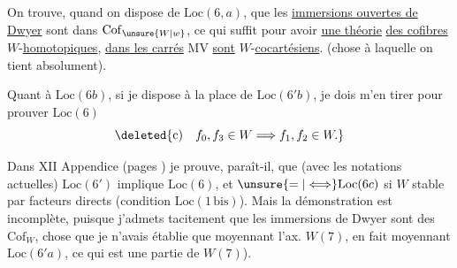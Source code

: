 
On trouve, quand on dispose de $\mathrm{Loc}(6,a)$, que les \uline{immersions ouvertes de Dwyer} sont dans $\mathrm{Cof}_{\unsure{W|w}}$,  ce qui suffit pour avoir \uline{une  théorie} \uline{des cofibres} $W$-\uline{homotopiques}, \uline{dans  les carrés} $\mathrm{MV}$ \uline{sont} $W$-\uline{cocartésiens}. (chose à laquelle on tient absolument).

Quant à $\mathrm{Loc}(6b)$,  si je dispose à la place de $\mathrm{Loc}(6'b)$,  je dois m'en tirer pour prouver $\mathrm{Loc}(6)$
\[
\deleted{\text{c)}\quad f_0,f_3\in W\Longrightarrow f_1,f_2\in W.}
\]

Dans XII Appendice (pages ) je prouve, paraît-il, que (avec les notations actuelles) $\mathrm{Loc}(6')$ implique $\mathrm{Loc}(6)$, et $\unsure{=|\Longleftrightarrow}\mathrm{Loc}(6c)$ si $W$ stable par facteurs directs (condition $\mathrm{Loc}(1\,\mathrm{bis})$). Mais la démonstration est incomplète, puisque j'admets tacitement que les immersions de Dwyer sont des $\mathrm{Cof}_W$, chose que je n'avais établie que moyennant l'ax. $W(7)$, en fait moyennant $\mathrm{Loc}(6'a)$, ce qui est une partie de $W(7)$).
